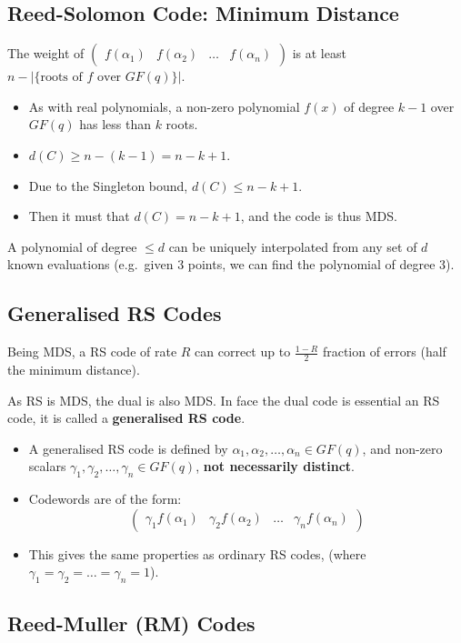 \documentclass[11pt]{article}
\begin{document}
\subsection{Reed-Solomon Code: Minimum Distance}
The weight of $
  \begin{pmatrix}
    f(\alpha_1) & f(\alpha_2) & \dots & f(\alpha_n)
  \end{pmatrix}
$ is at least $n - \lvert \{ \text{roots of $f$ over $GF(q)$} \} \rvert$.
\begin{itemize}
  \item As with real polynomials, a non-zero polynomial $f(x)$ of degree $k - 1$ over $GF(q)$ has less than $k$ roots.
  \item $d(C) \geq n - (k - 1) = n - k + 1$.
  \item Due to the Singleton bound, $d(C) \leq n - k + 1$.
  \item Then it must that $d(C) = n - k + 1$, and the code is thus MDS.
\end{itemize}

A polynomial of degree $\leq d$ can be uniquely interpolated from any set of $d$ known evaluations (e.g.\ given $3$ points, we can find the polynomial of degree $3$).

\subsection{Generalised RS Codes}
Being MDS, a RS code of rate $R$ can correct up to $\frac{1 - R}{2}$ fraction of errors (half the minimum distance).

As RS is MDS, the dual is also MDS.
In face the dual code is essential an RS code, it is called a \textbf{generalised RS code}.

\begin{itemize}
  \item A generalised RS code is defined by $\alpha_1, \alpha_2, \dots, \alpha_n \in GF(q)$, and non-zero scalars $\gamma_1, \gamma_2, \ldots, \gamma_n \in GF(q)$, \textbf{not necessarily distinct}.
  \item Codewords are of the form:
    \[
      \begin{pmatrix}
        \gamma_1f(\alpha_1) & \gamma_2f(\alpha_2) & \dots & \gamma_nf(\alpha_n)
      \end{pmatrix}
    \]
  \item This gives the same properties as ordinary RS codes, (where $\gamma_1 = \gamma_2 = \ldots = \gamma_n = 1$).
\end{itemize}

\subsection{Reed-Muller (RM) Codes}
\end{document}
